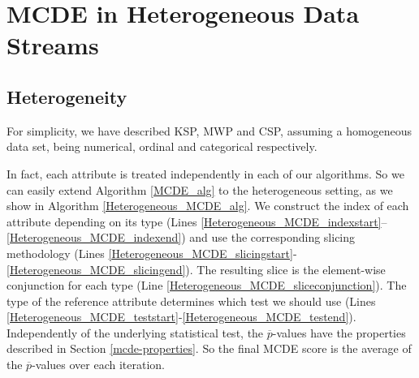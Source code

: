 \clearpage

\section{\gls{MCDE} in Heterogeneous Data Streams}

\subsection{Heterogeneity}

For simplicity, we have described \gls{KSP}, \gls{MWP} and \gls{CSP}, assuming a homogeneous data set, being numerical, ordinal and categorical respectively. 

In fact, each attribute is treated independently in each of our algorithms. So we can easily extend Algorithm \ref{MCDE_alg} to the heterogeneous setting, as we show in Algorithm \ref{Heterogeneous_MCDE_alg}. We construct the index of each attribute depending on its type (Lines \ref{Heterogeneous_MCDE_indexstart}--\ref{Heterogeneous_MCDE_indexend}) and use the corresponding slicing methodology (Lines \ref{Heterogeneous_MCDE_slicingstart}-\ref{Heterogeneous_MCDE_slicingend}). 
The resulting slice is the element-wise conjunction for each type (Line \ref{Heterogeneous_MCDE_sliceconjunction}). 
The type of the reference attribute determines which test we should use (Lines \ref{Heterogeneous_MCDE_teststart}-\ref{Heterogeneous_MCDE_testend}). 
Independently of the underlying statistical test, the $\overline{p}$-values have the properties described in Section \ref{mcde-properties}. 
So the final \gls{MCDE} score is the average of the $\overline{p}$-values over each iteration.

